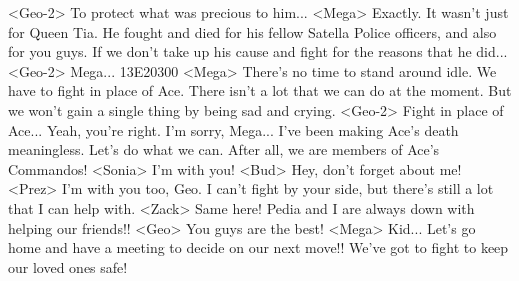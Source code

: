 <Geo-2> To protect what was precious to him... 
<Mega> Exactly. 
It wasn't just for Queen Tia. 
He fought and died for his fellow Satella Police officers, and also for you guys. 
If we don't take up his cause and fight for the reasons that he did... 
<Geo-2> Mega... 
{13}{E2}{03}{00} 
<Mega> There's no time to stand around idle. 
We have to fight in place of Ace. 
There isn't a lot that we can do at the moment. 
But we won't gain a single thing by being sad and crying. 
<Geo-2> Fight in place of Ace... 
Yeah, you're right. 
I'm sorry, Mega... 
I've been making Ace's death meaningless. 
Let's do what we can. 
After all, we are members of Ace's Commandos! 
<Sonia> I'm with you! 
<Bud> Hey, don't forget about me! 
<Prez> I'm with you too, Geo. 
I can't fight by your side, but there's still a lot that I can help with. 
<Zack> Same here! Pedia and I are always down with helping our friends!! 
<Geo> You guys are the best! 
<Mega> Kid... Let's go home and have a meeting to decide on our next move!! 
We've got to fight to keep our loved ones safe! 
